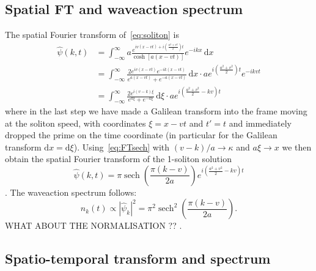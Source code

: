 \documentclass[11pt,a4paper]{article}
\DeclareMathOperator{\sech}{sech}
\begin{document}
\subsection{Spatial FT and waveaction spectrum}
The spatial Fourier transform of~\eqref{eq:soliton} is
\begin{align*}
	\hat{\psi}(k,t) &=  \int_{-\infty}^\infty \!  a\frac{e^{iv(x-vt) + i(\frac{a^2+v^2}{2})t}}{\cosh\left[ a(x-vt) \right]} e^{-ikx}  \,\mathrm{d}x   \\
						&=  \int_{-\infty}^\infty \!  \frac{ 2 e^{iv(x-vt)} e^{-ik(x-vt)} }{e^{a(x-vt)}+e^{-a(x-vt)}}   \,\mathrm{d}x  
								\cdot ae^{i(\frac{a^2+v^2}{2})t}e^{-ikvt}									\\
						&= \int_{-\infty}^\infty \!  \frac{ 2 e^{i(v-k)\xi} }{e^{a\xi}+e^{-a\xi}}   \,\mathrm{d}\xi  
								\cdot ae^{i(\frac{a^2+v^2}{2}-kv)t}
\end{align*}
where in the last step we have made a Galilean transform into the frame moving at the soliton speed, with coordinates  $\xi=x-vt$ and $t'=t$ and immediately dropped the prime on the time coordinate (in particular for the Galilean transform $\mathrm{d}x = \mathrm{d}\xi$). Using~\eqref{eq:FTsech} with $(v-k)/a \to \kappa$ and $a\xi\to x$ we then obtain the spatial Fourier transform of the 1-soliton solution
\begin{equation}
	\label{eq:psihat_soli}
	\hat{\psi}(k,t) 	= \pi \sech\left( \frac{\pi(k-v)}{2a} \right) e^{i(\frac{a^2+v^2}{2}-kv)t}		
\end{equation}.
The waveaction spectrum follows:
\begin{equation}
	\label{eq:nk_soli}
	n_k(t) \propto |\hat{\psi}_k|^2 = \pi^2 \sech^2\left( \frac{\pi(k-v)}{2a} \right).
\end{equation}
{\color{red} WHAT ABOUT THE NORMALISATION ?? }.

\subsection{Spatio-temporal transform and spectrum}
\end{document}
